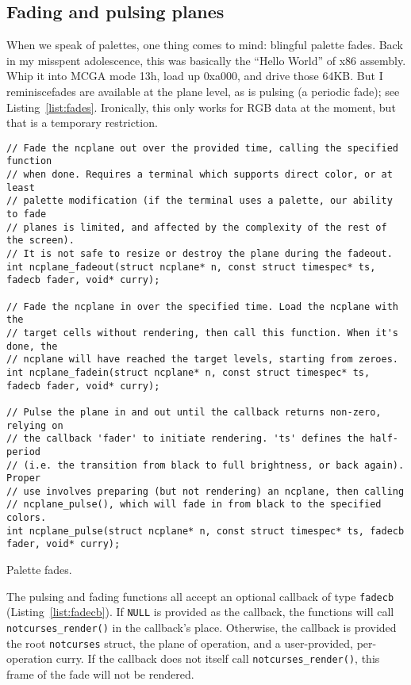 \subsection{Fading and pulsing planes}
When we speak of palettes, one thing comes to mind: blingful palette fades.
Back in my misspent adolescence, this was basically the ``Hello World'' of
x86 assembly. Whip it into MCGA mode 13h, load up 0xa000, and drive those
64KB. But I reminisce\textellipsis fades are available at the plane level,
as is pulsing (a periodic fade); see Listing~\ref{list:fades}. Ironically,
this only works for RGB data at the moment, but that is a temporary restriction.

\begin{listing}[!htb]
\begin{verbatim}
// Fade the ncplane out over the provided time, calling the specified function
// when done. Requires a terminal which supports direct color, or at least
// palette modification (if the terminal uses a palette, our ability to fade
// planes is limited, and affected by the complexity of the rest of the screen).
// It is not safe to resize or destroy the plane during the fadeout.
int ncplane_fadeout(struct ncplane* n, const struct timespec* ts, fadecb fader, void* curry);

// Fade the ncplane in over the specified time. Load the ncplane with the
// target cells without rendering, then call this function. When it's done, the
// ncplane will have reached the target levels, starting from zeroes.
int ncplane_fadein(struct ncplane* n, const struct timespec* ts, fadecb fader, void* curry);

// Pulse the plane in and out until the callback returns non-zero, relying on
// the callback 'fader' to initiate rendering. 'ts' defines the half-period
// (i.e. the transition from black to full brightness, or back again). Proper
// use involves preparing (but not rendering) an ncplane, then calling
// ncplane_pulse(), which will fade in from black to the specified colors.
int ncplane_pulse(struct ncplane* n, const struct timespec* ts, fadecb fader, void* curry);
\end{verbatim}
\caption{Palette fades.}
\label{list:fades}
\end{listing}

The pulsing and fading functions all accept an optional callback of type
\texttt{fadecb} (Listing~\ref{list:fadecb}). If \texttt{NULL} is provided as
the callback, the functions will call \texttt{notcurses\_render()} in the
callback's place. Otherwise, the callback is provided the root
\texttt{notcurses} struct, the plane of operation, and a user-provided,
per-operation curry. If the callback does not itself call
\texttt{notcurses\_render()}, this frame of the fade will not be rendered.

